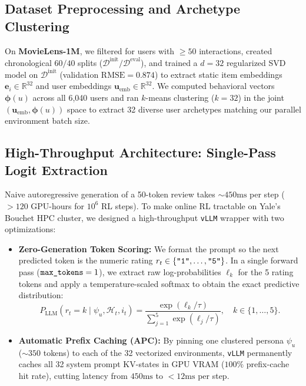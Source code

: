 \documentclass{article}
\begin{document}
\subsection{Dataset Preprocessing and Archetype Clustering}
On \textbf{MovieLens-1M}, we filtered for users with $\ge 50$ interactions, created chronological $60/40$ splits ($\mathcal{D}^{\text{init}} / \mathcal{D}^{\text{eval}}$), and trained a $d=32$ regularized SVD model on $\mathcal{D}^{\text{init}}$ (validation $\text{RMSE} = 0.874$) to extract static item embeddings $\bm{e}_i \in \mathbb{R}^{32}$ and user embeddings $\bm{u}_{\text{emb}} \in \mathbb{R}^{32}$. We computed behavioral vectors $\bm{\phi}(u)$ across all 6,040 users and ran $k$-means clustering ($k=32$) in the joint $(\bm{u}_{\text{emb}}, \bm{\phi}(u))$ space to extract 32 diverse user archetypes matching our parallel environment batch size.

\subsection{High-Throughput Architecture: Single-Pass Logit Extraction}
Naive autoregressive generation of a 50-token review takes $\sim 450\text{ms}$ per step ($>120$ GPU-hours for $10^6$ RL steps). To make online RL tractable on Yale's Bouchet HPC cluster, we designed a high-throughput \texttt{vLLM} wrapper with two optimizations:
\begin{itemize}
    \item \textbf{Zero-Generation Token Scoring:} We format the prompt so the next predicted token is the numeric rating $r_t \in \{\text{\texttt{"1"}}, \dots, \text{\texttt{"5"}}\}$. In a single forward pass ($\text{\texttt{max\_tokens}}=1$), we extract raw log-probabilities $\ell_k$ for the 5 rating tokens and apply a temperature-scaled softmax to obtain the exact predictive distribution:
    \begin{equation}
        P_{\text{LLM}}(r_t = k \mid \psi_u, \mathcal{H}_t, i_t) = \frac{\exp(\ell_k / \tau)}{\sum_{j=1}^5 \exp(\ell_j / \tau)}, \quad k \in \{1,\dots,5\}.
    \end{equation}
    \item \textbf{Automatic Prefix Caching (APC):} By pinning one clustered persona $\psi_u$ ($\sim 350$ tokens) to each of the 32 vectorized environments, \texttt{vLLM} permanently caches all 32 system prompt KV-states in GPU VRAM ($100\%$ prefix-cache hit rate), cutting latency from $450\text{ms}$ to $<12\text{ms}$ per step.
\end{itemize}
\end{document}

